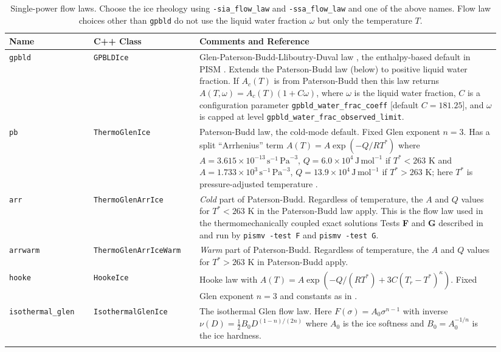 \begin{table}[ht]
\centering
{}
\small
\begin{tabular}{p{0.16\linewidth}p{0.2\linewidth}p{0.58\linewidth}}\toprule
\textbf{Name} & C++ Class & \textbf{Comments and Reference} \\ \midrule
\texttt{gpbld} &\texttt{GPBLDIce}  & Glen-Paterson-Budd-Lliboutry-Duval law \cite{LliboutryDuval1985}, the enthalpy-based default in PISM \cite{AschwandenBuelerKhroulevBlatter}.  Extends the Paterson-Budd law (below) to positive liquid water fraction.  If $A_{c}(T)$ is from Paterson-Budd then this law returns $A(T,\omega) = A_{c}(T) (1 + C \omega)$, where $\omega$ is the liquid water fraction, $C$ is a configuration parameter \texttt{gpbld_water_frac_coeff} [default $C=181.25$], and $\omega$ is capped at level \texttt{gpbld_water_frac_observed_limit}.  \\  \midrule
\texttt{pb} &\texttt{ThermoGlenIce}  & Paterson-Budd law, the cold-mode default.  Fixed Glen exponent $n=3$.  Has a split ``Arrhenius'' term $A(T) = A \exp(-Q/RT^*)$ where \mbox{$A = 3.615 \times 10^{-13}\, \text{s}^{-1}\, \text{Pa}^{-3}$}, \mbox{$Q = 6.0 \times 10^4\, \text{J}\, \text{mol}^{-1}$} if $T^* < 263$ K and
 \mbox{$A = 1.733 \times 10^{3}\, \text{s}^{-1}\, \text{Pa}^{-3}$}, \mbox{$Q = 13.9 \times 10^4\, \text{J}\, \text{mol}^{-1}$} if $T^* > 263$ K; here $T^*$ is pressure-adjusted temperature \cite{PatersonBudd}. \\
\texttt{arr} &  \texttt{ThermoGlenArrIce} & \emph{Cold} part of Paterson-Budd.  Regardless of temperature, the $A$ and $Q$ values for $T^*<263$ K in  the Paterson-Budd law apply.  This is the flow law used in the thermomechanically coupled exact solutions Tests \textbf{F} and \textbf{G} described in \cite{BBL,BB} and run by \texttt{pismv -test F} and \texttt{pismv -test G}. \\
\texttt{arrwarm} & \texttt{ThermoGlenArrIceWarm} & \emph{Warm} part of Paterson-Budd.  Regardless of temperature, the $A$ and $Q$ values for $T^*>263$ K in Paterson-Budd apply.\\
\texttt{hooke} & \texttt{HookeIce} & Hooke law with \mbox{$A(T) = A \exp(-Q/(RT^*) + 3C (T_r - T^*)^\kappa)$.}  Fixed Glen exponent $n=3$ and constants as in \cite{Hooke,PayneBaldwin}.\\
\texttt{isothermal_glen} &  \texttt{IsothermalGlenIce} & The isothermal Glen flow law.  Here $F(\sigma) = A_0 \sigma^{n-1}$ with inverse $\nu(D) = \frac{1}{2} B_0 D^{(1-n)/(2n)}$ where $A_0$ is the ice softness and $B_0=A_0^{-1/n}$ is the ice hardness. \\
\bottomrule
\normalsize	
\end{tabular}
\caption{Single-power flow laws.  Choose the ice rheology using \texttt{-sia_flow_law} and \texttt{-ssa_flow_law} and one of the above names.  Flow law choices other than \texttt{gpbld} do not use the liquid water fraction $\omega$ but only the temperature $T$.}
\label{tab:flowlaw}
\end{table}

